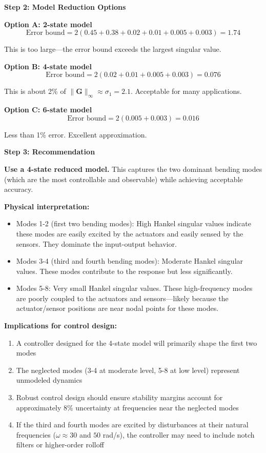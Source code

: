 \textbf{Step 2: Model Reduction Options}

\textbf{Option A: 2-state model}
\begin{equation}
\text{Error bound} = 2(0.45 + 0.38 + 0.02 + 0.01 + 0.005 + 0.003) = 1.74
\end{equation}

This is too large---the error bound exceeds the largest singular value.

\textbf{Option B: 4-state model}
\begin{equation}
\text{Error bound} = 2(0.02 + 0.01 + 0.005 + 0.003) = 0.076
\end{equation}

This is about 2\% of $\|\mathbf{G}\|_\infty \approx \sigma_1 = 2.1$. Acceptable for many applications.

\textbf{Option C: 6-state model}
\begin{equation}
\text{Error bound} = 2(0.005 + 0.003) = 0.016
\end{equation}

Less than 1\% error. Excellent approximation.

\textbf{Step 3: Recommendation}

\textbf{Use a 4-state reduced model.} This captures the two dominant bending modes (which are the most controllable and observable) while achieving acceptable accuracy.

\textbf{Physical interpretation:}
\begin{itemize}
\item Modes 1-2 (first two bending modes): High Hankel singular values indicate these modes are easily excited by the actuators and easily sensed by the sensors. They dominate the input-output behavior.
\item Modes 3-4 (third and fourth bending modes): Moderate Hankel singular values. These modes contribute to the response but less significantly.
\item Modes 5-8: Very small Hankel singular values. These high-frequency modes are poorly coupled to the actuators and sensors---likely because the actuator/sensor positions are near nodal points for these modes.
\end{itemize}

\textbf{Implications for control design:}
\begin{enumerate}
\item A controller designed for the 4-state model will primarily shape the first two modes
\item The neglected modes (3-4 at moderate level, 5-8 at low level) represent unmodeled dynamics
\item Robust control design should ensure stability margins account for approximately 8\% uncertainty at frequencies near the neglected modes
\item If the third and fourth modes are excited by disturbances at their natural frequencies ($\omega \approx 30$ and $50$ rad/s), the controller may need to include notch filters or higher-order rolloff
\end{enumerate}


